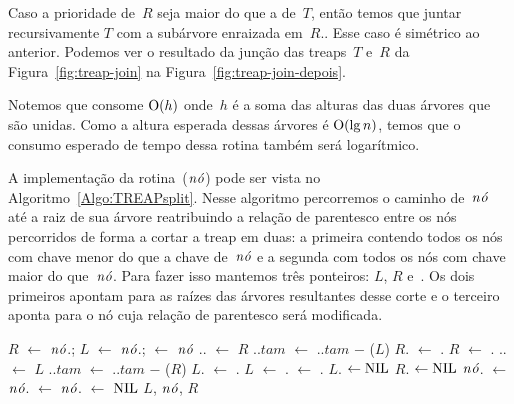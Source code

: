 Caso a prioridade de~$R$ seja maior do que a de~$T$, então temos que juntar recursivamente $T$ com a subárvore enraizada em~$R$.. Esse caso é simétrico ao anterior.
Podemos ver o resultado da junção das treaps~$T$ e~$R$ da Figura~\ref{fig:treap-join} na Figura~\ref{fig:treap-join-depois}.


%

Notemos que \treapJoin{} consome $\mathrm{O}(h)$ onde~$h$ é a soma das alturas das duas árvores que são unidas.
Como a altura esperada dessas árvores é $\mathrm{O}(\lg n)$, temos que o consumo esperado de tempo dessa rotina também será logarítmico.


A implementação da rotina~\treapSplit($\node$) pode ser vista no Algoritmo~\ref{Algo:TREAPsplit}.
Nesse algoritmo percorremos o caminho de~$\node$ até a raiz de sua árvore reatribuindo a relação de parentesco entre os nós percorridos de forma a cortar a treap em duas:
a primeira contendo todos os nós com chave menor do que a chave de~$\node$ e a segunda com todos os nós com chave maior do que~$\node$.
Para fazer isso mantemos três ponteiros: $L$, $R$ e~. 
Os dois primeiros apontam para as raízes das árvores resultantes desse corte e o terceiro aponta para o nó cuja relação de parentesco será modificada.

\begin{algorithm}
\caption{\treapSplit($\node$)}
\label{Algo:TREAPsplit}
\begin{algorithmic}[1]
\State $R$ $\gets $ $\node$.; $L$ $\gets $ $\node$.;  $\gets$ $\node$
    \State {}.. $\gets$ $R$
    \State {}..$tam$ $\gets$ ..$tam$ $\mathit{-}$ \treapGetSize($L$)
    \State $R$. $\gets$ .
    \EndIf
    \State $R$ $\gets$ .
  \Else
    \State {}.. $\gets$ $L$ 
    \State {}..$tam$ $\gets$ ..$tam$ $\mathit{-}$ \treapGetSize($R$)
    \State $L$. $\gets$ .
    \EndIf
    \State $L$ $\gets$ .
  \EndIf
  \State {} $\gets$ .
\EndWhile
{} $L$. $\gets\text{NIL}$\EndIf
{} $R$. $\gets\text{NIL}$\EndIf
\State $\node$. $\gets $ $\node$. $\gets$ $\node$. $\gets$ $\text{NIL}$
\State\Return $L$, $\node$, $R$
\end{algorithmic}
\end{algorithm}

